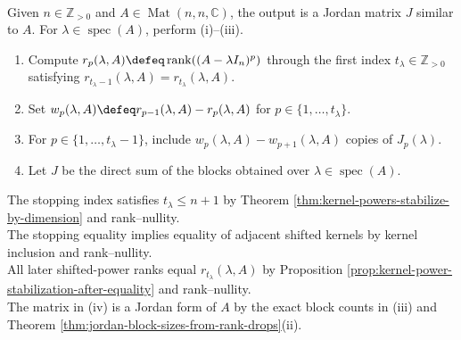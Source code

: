 \begin{computationmethod} \label{meth:jordan-form-from-rank-drops} \\
Given $n\in\mathbb{Z}_{>0}$ and $A\in\operatorname{Mat}(n,n,\mathbb{C})$, the output is a Jordan matrix $J$ similar to $A$. For $\lambda\in\operatorname{spec}(A)$, perform (i)--(iii).
\begin{enumerate}[label=(\roman*)]
\setlength{\itemsep}{0pt}
\item Compute $r_p(\lambda,A)\defeq\operatorname{rank}((A-\lambda I_n)^p)$ through the first index $t_{\lambda}\in\mathbb{Z}_{>0}$ satisfying $r_{t_{\lambda}-1}(\lambda,A)=r_{t_{\lambda}}(\lambda,A)$.
\item Set $w_p(\lambda,A)\defeq r_{p-1}(\lambda,A)-r_p(\lambda,A)$ for $p\in\{1,\ldots,t_{\lambda}\}$.
\item For $p\in\{1,\ldots,t_{\lambda}-1\}$, include $w_p(\lambda,A)-w_{p+1}(\lambda,A)$ copies of $J_p(\lambda)$.
\item Let $J$ be the direct sum of the blocks obtained over $\lambda\in\operatorname{spec}(A)$.
\end{enumerate}
The stopping index satisfies $t_{\lambda}\leq n+1$ by Theorem \ref{thm:kernel-powers-stabilize-by-dimension} and rank--nullity.\\
The stopping equality implies equality of adjacent shifted kernels by kernel inclusion and rank--nullity.\\
All later shifted-power ranks equal $r_{t_{\lambda}}(\lambda,A)$ by Proposition \ref{prop:kernel-power-stabilization-after-equality} and rank--nullity.\\
The matrix in (iv) is a Jordan form of $A$ by the exact block counts in (iii) and Theorem \ref{thm:jordan-block-sizes-from-rank-drops}(ii).
\end{computationmethod}
